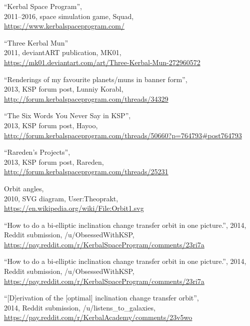 \renewcommand{\cleardoublepage}{\ifodd\thepage\null\newpage\fi}
\fancyhf{}
\renewcommand{\footrulewidth}{0pt}
\begin{thebibliography}{99}
\ClearWallPaper

“Kerbal Space Program”, \\
2011--2016, space simulation game, Squad, \\
\url{https://www.kerbalspaceprogram.com/}

“Three Kerbal Mun” \\
2011, deviantART publication, MK01, \\
\url{https://mk01.deviantart.com/art/Three-Kerbal-Mun-272960572}

“Renderings of my favourite planets/muns in banner form”, \\
2013, KSP forum post, Lunniy Korabl, \\
\url{http://forum.kerbalspaceprogram.com/threads/34329}

“The Six Words You Never Say in KSP”, \\
2013, KSP forum post, Hayoo, \\
{\footnotesize \url{http://forum.kerbalspaceprogram.com/threads/50660?p=764793#post764793}}

“Rareden's Projects”, \\
2013, KSP forum post, Rareden, \\
\url{http://forum.kerbalspaceprogram.com/threads/25231}

Orbit angles, \\
2010, SVG diagram, User:Theoprakt, \\
{\footnotesize\url{https://en.wikipedia.org/wiki/File:Orbit1.svg}}

“How to do a bi-elliptic inclination change transfer orbit in one picture.”,
2014, Reddit submission, /u/ObsessedWithKSP, \\
\url{https://pay.reddit.com/r/KerbalSpaceProgram/comments/23ri7a}

“How to do a bi-elliptic inclination change transfer orbit in one picture.”,
2014, Reddit submission, /u/ObsessedWithKSP, \\
\url{https://pay.reddit.com/r/KerbalSpaceProgram/comments/23ri7a}

“[D]erivation of the [optimal] inclination change transfer orbit”, \\
2014, Reddit submission, /u/listens\_to\_galaxies, \\
\url{https://pay.reddit.com/r/KerbalAcademy/comments/23v5wo}


\end{thebibliography}

